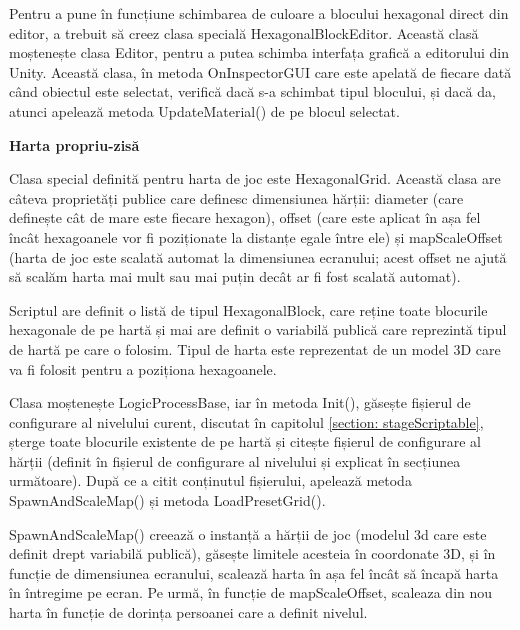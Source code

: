 \documentclass[12pt, a4paper]{article}
\begin{document}
	Pentru a pune în funcțiune schimbarea de culoare a blocului hexagonal direct din editor, a trebuit să creez clasa specială HexagonalBlockEditor. Această clasă moștenește clasa Editor, pentru a putea schimba interfața grafică a editorului din Unity. Această clasa, în metoda OnInspectorGUI care este apelată de fiecare dată când obiectul este selectat, verifică dacă s-a schimbat tipul blocului, și dacă da, atunci apelează metoda UpdateMaterial() de pe blocul selectat.
	\newline
	
	
	
	
	
	\textbf{Harta propriu-zisă}
	
	Clasa special definită pentru harta de joc este HexagonalGrid. Această clasa are câteva proprietăți publice care definesc dimensiunea hărții: diameter (care definește cât de mare este fiecare hexagon), offset (care este aplicat în așa fel încât hexagoanele vor fi poziționate la distanțe egale între ele) și mapScaleOffset (harta de joc este scalată automat la dimensiunea ecranului; acest offset ne ajută să scalăm harta mai mult sau mai puțin decât ar fi fost scalată automat).
	\newline
	
	Scriptul are definit o listă de tipul HexagonalBlock, care reține toate blocurile hexagonale de pe hartă și mai are definit o variabilă publică care reprezintă tipul de hartă pe care o folosim. Tipul de harta este reprezentat de un model 3D care va fi folosit pentru a poziționa hexagoanele.
	\newline
	
	Clasa moștenește LogicProcessBase, iar în metoda Init(), găsește fișierul de configurare al nivelului curent, discutat în capitolul \ref{section: stageScriptable}, șterge toate blocurile existente de pe hartă și citește fișierul de configurare al hărții (definit în fișierul de configurare al nivelului și explicat în secțiunea următoare). După ce a citit conținutul fișierului, apelează metoda SpawnAndScaleMap() și metoda LoadPresetGrid().
	\newline
	
	SpawnAndScaleMap() creează o instanță a hărții de joc (modelul 3d care este definit drept variabilă publică), găsește limitele acesteia în coordonate 3D, și în funcție de dimensiunea ecranului, scalează harta în așa fel încât să încapă harta în întregime pe ecran. Pe urmă, în funcție de mapScaleOffset, scaleaza din nou harta în funcție de dorința persoanei care a definit nivelul.
	\newline
	
\end{document}
